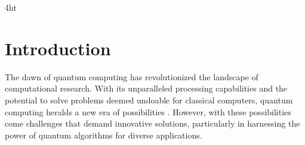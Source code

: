 \documentclass[
  a4paper,  %
  twoside,  %
  bibliography=totoc,
  headsepline,
  cleardoublepage=empty,
  parskip=half,
  draft=false
]{scrbook}
\begin{document}

\printnoidxglossaries

\iftex4ht
\else
\fi



\renewcommand*{\chapterpagestyle}{scrplain}
\pagestyle{scrheadings}
\pagestyle{scrheadings}
\ihead[]{}
\chead[]{}
\ohead[]{\headmark}
\cfoot[]{}
\ifoot[]{}

































%
%

\chapter{Introduction}
\label{chap:introduction}

The dawn of quantum computing has revolutionized the landscape of computational research.
With its unparalleled processing capabilities and the potential to solve problems deemed undoable for classical computers, quantum computing heralds a new era of possibilities \cite{Shor}.
However, with these possibilities come challenges that demand innovative solutions, particularly in harnessing the power of quantum algorithms for diverse applications.
\end{document}
